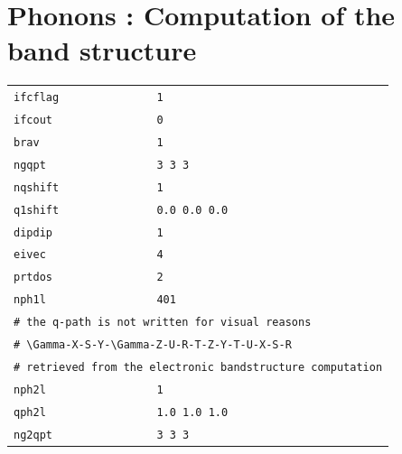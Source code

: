 \documentclass[11pt,a4paper]{article}
\begin{document}
\section{Phonons : Computation of the band structure}
\begin{center}
\begin{tabular}{lll}
\texttt{ifcflag}&\texttt{1}&\\
\texttt{ifcout}&\texttt{0}&\\
\texttt{brav}&\texttt{1}&\\
\texttt{ngqpt}&\texttt{3 3 3}&\\
\texttt{nqshift}&\texttt{1}&\\
\texttt{q1shift}&\texttt{0.0 0.0 0.0}&\\
\texttt{dipdip}&\texttt{1}&\\
\texttt{eivec}&\texttt{4}&\\
\texttt{prtdos}&\texttt{2}&\\
\texttt{nph1l}&\texttt{401}&\\
\multicolumn{3}{l}{\texttt{\# the q-path is not written for visual reasons}}\\
\multicolumn{3}{l}{\texttt{\# \textbackslash Gamma-X-S-Y-\textbackslash Gamma-Z-U-R-T-Z-Y-T-U-X-S-R}}\\
\multicolumn{3}{l}{\texttt{\# retrieved from the electronic bandstructure computation}}\\
\texttt{nph2l}&\texttt{1}&\\
\texttt{qph2l}&\texttt{1.0 1.0 1.0}&\\
\texttt{ng2qpt}&\texttt{3 3 3}&\\
\end{tabular}
\end{center}
\newpage
\end{document}

